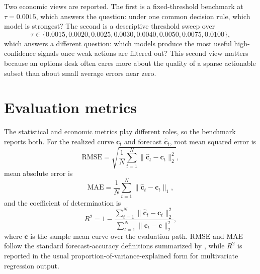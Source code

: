 \documentclass[12pt]{report}
\begin{document}
Two economic views are reported. The first is a fixed-threshold benchmark at \(\tau=0.0015\), which answers the question: under one common decision rule, which model is strongest? The second is a descriptive threshold sweep over
\[
\tau \in \{0.0015,0.0020,0.0025,0.0030,0.0040,0.0050,0.0075,0.0100\},
\]
which answers a different question: which models produce the most useful high-confidence signals once weak actions are filtered out? This second view matters because an options desk often cares more about the quality of a sparse actionable subset than about small average errors near zero.

\section{Evaluation metrics}
The statistical and economic metrics play different roles, so the benchmark reports both. For the realized curve \(\mathbf{c}_t\) and forecast \(\hat{\mathbf{c}}_t\), root mean squared error is
\[
\mathrm{RMSE}=\sqrt{\frac{1}{N}\sum_{t=1}^{N}\lVert \hat{\mathbf{c}}_t-\mathbf{c}_t\rVert_2^2},
\]
mean absolute error is
\[
\mathrm{MAE}=\frac{1}{N}\sum_{t=1}^{N}\lVert \hat{\mathbf{c}}_t-\mathbf{c}_t\rVert_1,
\]
and the coefficient of determination is
\[
R^2 = 1 - \frac{\sum_{t=1}^{N}\lVert \hat{\mathbf{c}}_t-\mathbf{c}_t\rVert_2^2}{\sum_{t=1}^{N}\lVert \mathbf{c}_t-\bar{\mathbf{c}}\rVert_2^2},
\]
where \(\bar{\mathbf{c}}\) is the sample mean curve over the evaluation path. RMSE and MAE follow the standard forecast-accuracy definitions summarized by \citet{hyndman2006}, while \(R^2\) is reported in the usual proportion-of-variance-explained form for multivariate regression output.
\end{document}
